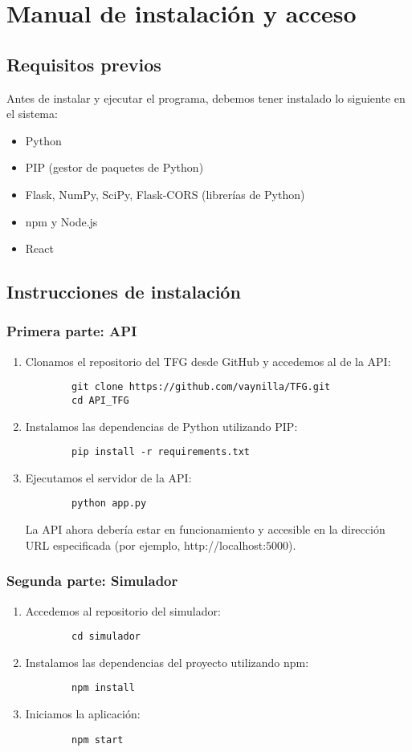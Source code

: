 \chapter{Manual de instalación y acceso}\label{ap:apendice1}
\section{Requisitos previos}
Antes de instalar y ejecutar el programa, debemos tener instalado lo siguiente en el sistema:
\begin{itemize}
	\item Python
	\item PIP (gestor de paquetes de Python)
	\item Flask, NumPy, SciPy, Flask-CORS (librerías de Python)
	\item npm y Node.js
	\item React
\end{itemize}
\section{Instrucciones de instalación}
\subsection{Primera parte: API}
\begin{enumerate}
	\item Clonamos el repositorio del TFG desde GitHub y accedemos al de la API:
	\begin{verbatim}
		git clone https://github.com/vaynilla/TFG.git
		cd API_TFG
	\end{verbatim}
	\item Instalamos las dependencias de Python utilizando PIP:
	\begin{verbatim}
		pip install -r requirements.txt
	\end{verbatim}
	\item Ejecutamos el servidor de la API:
	\begin{verbatim}
		python app.py
	\end{verbatim}
	La API ahora debería estar en funcionamiento y accesible en la dirección URL especificada (por ejemplo, http://localhost:$5000$).
\end{enumerate}
\subsection{Segunda parte: Simulador}
\begin{enumerate}
	\item Accedemos al repositorio del simulador:
	\begin{verbatim}
		cd simulador
	\end{verbatim}
	\item Instalamos las dependencias del proyecto utilizando npm:
	\begin{verbatim}
		npm install
	\end{verbatim}
	\item Iniciamos la aplicación:
	\begin{verbatim}
		npm start
	\end{verbatim}
\end{enumerate}
